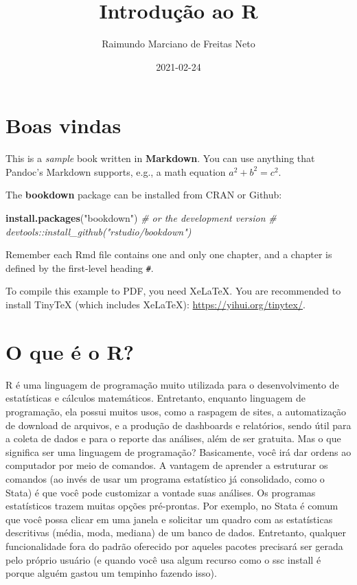 \documentclass[
]{book}
\title{Introdução ao R}
\author{Raimundo Marciano de Freitas Neto}
\date{2021-02-24}
\newenvironment{Shaded}{\begin{snugshade}}{\end{snugshade}}
\newcommand{\CommentTok}[1]{\textcolor[rgb]{0.56,0.35,0.01}{\textit{#1}}}
\newcommand{\KeywordTok}[1]{\textcolor[rgb]{0.13,0.29,0.53}{\textbf{#1}}}
\newcommand{\NormalTok}[1]{#1}
\newcommand{\StringTok}[1]{\textcolor[rgb]{0.31,0.60,0.02}{#1}}
\begin{document}
\maketitle

{
\setcounter{tocdepth}{1}
\tableofcontents
}
\hypertarget{boas-vindas}{%
\chapter{Boas vindas}\label{boas-vindas}}

This is a \emph{sample} book written in \textbf{Markdown}. You can use anything that Pandoc's Markdown supports, e.g., a math equation \(a^2 + b^2 = c^2\).

The \textbf{bookdown} package can be installed from CRAN or Github:

\begin{Shaded}
\begin{Highlighting}[]
\KeywordTok{install.packages}\NormalTok{(}\StringTok{"bookdown"}\NormalTok{)}
\CommentTok{# or the development version}
\CommentTok{# devtools::install_github("rstudio/bookdown")}
\end{Highlighting}
\end{Shaded}

Remember each Rmd file contains one and only one chapter, and a chapter is defined by the first-level heading \texttt{\#}.

To compile this example to PDF, you need XeLaTeX. You are recommended to install TinyTeX (which includes XeLaTeX): \url{https://yihui.org/tinytex/}.

\hypertarget{intro}{%
\chapter{O que é o R?}\label{intro}}

R é uma linguagem de programação muito utilizada para o desenvolvimento de estatísticas e cálculos matemáticos. Entretanto, enquanto linguagem de programação, ela possui muitos usos, como a raspagem de sites, a automatização de download de arquivos, e a produção de dashboards e relatórios, sendo útil para a coleta de dados e para o reporte das análises, além de ser gratuita.
Mas o que significa ser uma linguagem de programação? Basicamente, você irá dar ordens ao computador por meio de comandos. A vantagem de aprender a estruturar os comandos (ao invés de usar um programa estatístico já consolidado, como o Stata) é que você pode customizar a vontade suas análises. Os programas estatísticos trazem muitas opções pré-prontas. Por exemplo, no Stata é comum que você possa clicar em uma janela e solicitar um quadro com as estatísticas descritivas (média, moda, mediana) de um banco de dados. Entretanto, qualquer funcionalidade fora do padrão oferecido por aqueles pacotes precisará ser gerada pelo próprio usuário (e quando você usa algum recurso como o ssc install é porque alguém gastou um tempinho fazendo isso).
\end{document}
